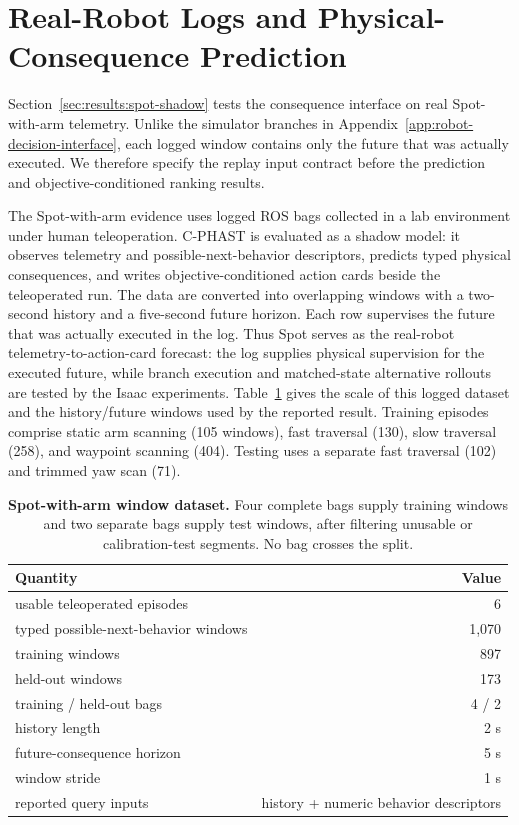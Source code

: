 \section{Real-Robot Logs and Physical-Consequence Prediction}
\label{app:spot-data}

Section~\ref{sec:results:spot-shadow} tests the consequence interface on real
Spot-with-arm telemetry. Unlike the simulator branches in
Appendix~\ref{app:robot-decision-interface}, each logged window contains only
the future that was actually executed. We therefore specify the replay input
contract before the prediction and objective-conditioned ranking results.

The Spot-with-arm evidence uses logged ROS bags collected in a lab environment under human teleoperation.
C-PHAST is evaluated as a shadow model: it observes telemetry and possible-next-behavior descriptors, predicts typed physical consequences, and writes objective-conditioned action cards beside the teleoperated run.
The data are converted into overlapping windows with a two-second history and a five-second future horizon.
Each row supervises the future that was actually executed in the log.
Thus Spot serves as the real-robot telemetry-to-action-card forecast: the log supplies physical supervision for the executed future, while branch execution and matched-state alternative rollouts are tested by the Isaac experiments.
Table~\ref{tab:spot-dataset-arxiv} gives the scale of this logged dataset and the history/future windows used by the reported result.
Training episodes comprise static arm scanning (105 windows), fast traversal
(130), slow traversal (258), and waypoint scanning (404). Testing uses a
separate fast traversal (102) and trimmed yaw scan (71).

\begin{table}[H]
\centering
\small
\caption{\textbf{Spot-with-arm window dataset.}
Four complete bags supply training windows and two separate bags supply test windows, after filtering unusable or calibration-test segments. No bag crosses the split.}
\label{tab:spot-dataset-arxiv}
\begin{tabular}{@{}l r@{}}
\toprule
\textbf{Quantity} & \textbf{Value} \\
\midrule
usable teleoperated episodes & 6 \\
typed possible-next-behavior windows & 1,070 \\
training windows & 897 \\
held-out windows & 173 \\
training / held-out bags & 4 / 2 \\
history length & 2 s \\
future-consequence horizon & 5 s \\
window stride & 1 s \\
reported query inputs & history + numeric behavior descriptors \\
\bottomrule
\end{tabular}
\end{table}

